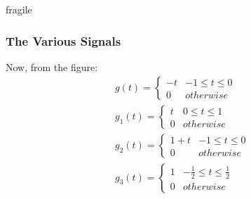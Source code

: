 \documentclass{beamer}
\begin{document}
\begin{frame}{fragile}
\frametitle{The Various Signals}

\begin{flushleft}
Now, from the figure:
\begin{align}
    g(t) = 
    \begin{cases}
    -t & -1 \leq t \leq 0\\
    0 & otherwise
    \end{cases}\\
    g_1(t) = 
    \begin{cases}
    t & 0 \leq t \leq 1\\
    0 & otherwise
    \end{cases}\\
    g_2(t) = 
    \begin{cases}
    1+t & -1 \leq t \leq 0\\
    0 & otherwise
    \end{cases}\\
    g_3(t) = 
    \begin{cases}
    1 & -\frac{1}{2} \leq t \leq \frac{1}{2}\\
    0 & otherwise
    \end{cases}
\end{align}
\end{flushleft}
\end{frame}
\end{document}

